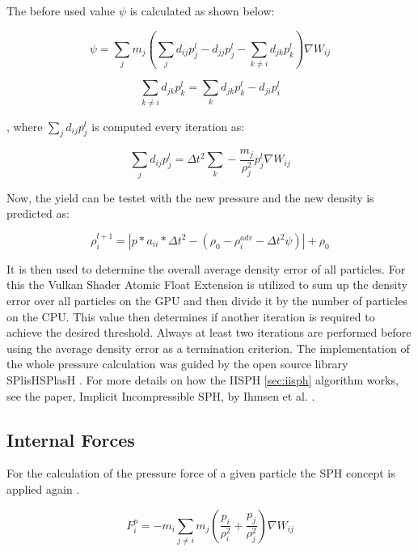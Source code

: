 \documentclass[intern]{cgMA}
\begin{document}
    The before used value $\psi$ is calculated as shown below:

    \begin{equation}
        \psi = \sum_j m_j (\sum_j d_{ij}p_j^l - d_{jj}p_j^l - \sum_{k \neq i} d_{jk}p_k^l) \nabla W_{ij}
    \end{equation}

    \begin{equation}
        \sum_{k \neq i} d_{jk}p_k^l = \sum_{k} d_{jk}p_k^l - d_{ji}p_i^l 
    \end{equation}

    , where $\sum_j d_{ij}p_j^l$ is computed every iteration as:

    \begin{equation}
        \sum_j d_{ij}p_j^l = \Delta t^2 \sum_{k} -\frac{m_j}{\rho_j^2} p_j^l \nabla W_{ij}
    \end{equation}

    Now, the yield can be testet with the new pressure and the new density is predicted as:

    \begin{equation}
        \rho_i^{l+1} = |p * a_{ii} * \Delta t^2 - (\rho_0 - \rho_i^{adv} - \Delta t^2 \psi)| + \rho_0
    \end{equation}

    It is then used to determine the overall average density error of all particles. For this the Vulkan Shader Atomic Float Extension is utilized to sum up the density error over all particles on the GPU and then divide it by the number of particles on the CPU. This value then determines if another iteration is required to achieve the desired threshold. Always at least two iterations are performed before using the average density error as a termination criterion. The implementation of the whole pressure calculation was guided by the open source library SPlisHSPlasH \cite{splishsplash}. For more details on how the IISPH \ref{sec:iisph} algorithm works, see the paper, Implicit Incompressible SPH, by Ihmsen et al. \cite{6570475}.

    \subsection{Internal Forces}
    
    For the calculation of the pressure force of a given particle the SPH concept is applied again \cite{10.2312:PE:vriphys:vriphys12:053-060}. 

    \begin{equation}
        F_i^p = -m_i \sum_{j \neq i} m_j (\frac{p_i}{\rho_i^2} + \frac{p_j}{\rho_j^2})  \nabla W_{ij}
    \end{equation}
    
\end{document}

